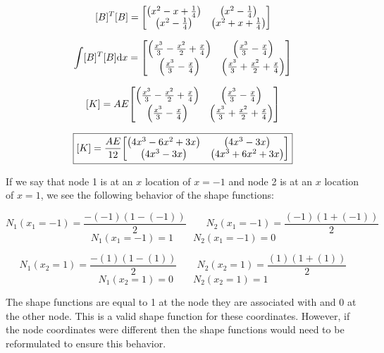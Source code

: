 \documentclass[../main.tex]{subfiles}
\begin{document}
\[
    [B]^T [B] = 
    \mqty[\left({x^2-x+\frac{1}{4}}\right) & \left({x^2 - \frac{1}{4}}\right) \\ \left({x^2 - \frac{1}{4}}\right) & \left({x^2+x+\frac{1}{4}}\right)]
\]

\[
    \int [B]^T [B] \dd x = 
    \mqty[\left({\frac{x^3}{3} - \frac{x^2}{2} + \frac{x}{4}}\right) & \left({\frac{x^3}{3} - \frac{x}{4}}\right) \\ \left({\frac{x^3}{3} - \frac{x}{4}}\right) & \left({\frac{x^3}{3} + \frac{x^2}{2} + \frac{x}{4}}\right)]
\]

\[
    [K] = AE \mqty[\left({\frac{x^3}{3} - \frac{x^2}{2} + \frac{x}{4}}\right) & \left({\frac{x^3}{3} - \frac{x}{4}}\right) \\ \left({\frac{x^3}{3} - \frac{x}{4}}\right) & \left({\frac{x^3}{3} + \frac{x^2}{2} + \frac{x}{4}}\right)]
\]

\[
    \boxed{
    [K] = \frac{AE}{12} \mqty[\left({4x^3 - 6x^2 + 3x}\right) & \left({4x^3-3x}\right) \\ \left({4x^3-3x}\right) & \left({4x^3 + 6x^2 + 3x}\right)]
    }
\]


If we say that node 1 is at an \(x\) location of \(x=-1\) and node 2 is at an \(x\) location of \(x=1\), we see the following behavior of the shape functions:

\[
    N_1(x_1=-1) =  \frac{-(-1)(1-(-1))}{2} \quad\quad N_2(x_1=-1) = \frac{(-1)(1+(-1))}{2}
\]
\[
    N_1(x_1=-1) =  1 \quad\quad N_2(x_1=-1) = 0
\]

\[
    N_1(x_2=1) =  \frac{-(1)(1-(1))}{2} \quad\quad N_2(x_2=1) = \frac{(1)(1+(1))}{2}
\]
\[
    N_1(x_2=1) = 0 \quad\quad N_2(x_2=1) = 1
\]

The shape functions are equal to 1 at the node they are associated with and 0 at the other node.
This is a valid shape function for these coordinates.
However, if the node coordinates were different then the shape functions would need to be reformulated to ensure this behavior.
\end{document}
